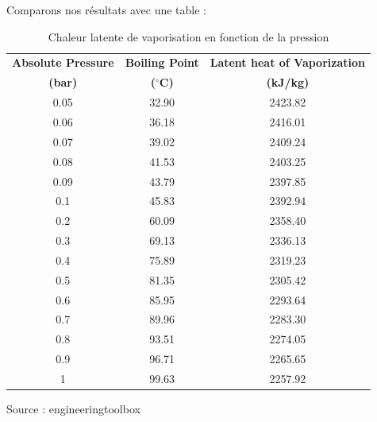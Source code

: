 \documentclass[12pt,a4paper]{article}
\begin{document}
Comparons nos résultats avec une table :
\begin{bigcenter}
\begin{table}[]
\centering
\begin{tabular}{ccc}
\textbf{Absolute Pressure} & \textbf{Boiling Point} & \textbf{Latent heat of Vaporization} \\
\textbf{(bar)}             & \textbf{($^\circ$C)}          & \textbf{(kJ/kg)}                     \\
0.05                       & 32.90                  & 2423.82                              \\
0.06                       & 36.18                  & 2416.01                              \\
0.07                       & 39.02                  & 2409.24                              \\
0.08                       & 41.53                  & 2403.25                              \\
0.09                       & 43.79                  & 2397.85                              \\
0.1                        & 45.83                  & 2392.94                              \\
0.2                        & 60.09                  & 2358.40                              \\
0.3                        & 69.13                  & 2336.13                              \\
0.4                        & 75.89                  & 2319.23                              \\
0.5                        & 81.35                  & 2305.42                              \\
0.6                        & 85.95                  & 2293.64                              \\
0.7                        & 89.96                  & 2283.30                              \\
0.8                        & 93.51                  & 2274.05                              \\
0.9                        & 96.71                  & 2265.65                              \\
1                          & 99.63                  & 2257.92                             
\end{tabular}
\caption{Chaleur latente de vaporisation en fonction de la pression}
Source : engineeringtoolbox
\label{my-label}
\end{table}
\end{bigcenter}
\end{document}

